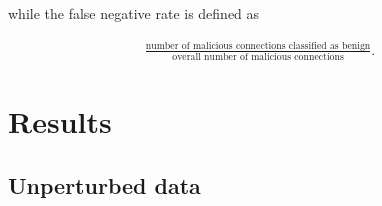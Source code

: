 \documentclass[conference]{IEEEtran}\usepackage[]{graphicx}\usepackage[]{color}
\begin{document}
while the false negative rate is defined as

\begin{align*}
\frac{\text{number of malicious connections classified as benign}}{\text{overall number of malicious connections}}.
\end{align*}




\section{Results}

\subsection{Unperturbed data}







\appendix




 
\end{document}
